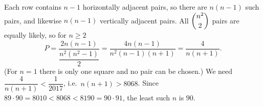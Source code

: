 Each row contains $n-1$ horizontally adjacent pairs, so there are $n(n-1)$ such pairs, and likewise $n(n-1)$ vertically adjacent pairs. All $\dbinom{n^2}{2}$ pairs are equally likely, so for $n\ge2$
\[
P=\dfrac{2n(n-1)}{\dfrac{n^2(n^2-1)}{2}}=\dfrac{4n(n-1)}{n^2(n-1)(n+1)}=\dfrac{4}{n(n+1)} .
\]
(For $n=1$ there is only one square and no pair can be chosen.) We need $\dfrac{4}{n(n+1)}<\dfrac{1}{2017}$, i.e.\ $n(n+1)>8068$. Since $89\cdot90=8010<8068<8190=90\cdot91$, the least such $n$ is $\boxed{90}$.
